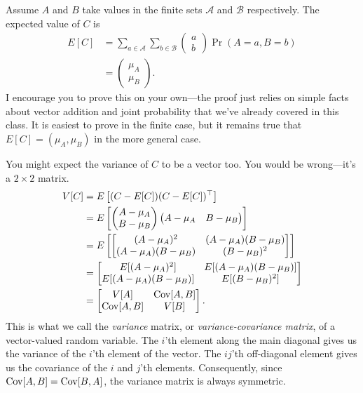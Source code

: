 \documentclass[
  12pt,
  oneside,openany]{book}
\begin{document}
Assume \(A\) and \(B\) take values in the finite sets \(\mathcal{A}\) and \(\mathcal{B}\) respectively. The expected value of \(C\) is
\[
\begin{aligned}
E[C]
&= \sum_{a \in \mathcal{A}} \sum_{b \in \mathcal{B}} \begin{pmatrix} a \\ b \end{pmatrix} \Pr(A = a, B = b) \\
&= \begin{pmatrix} \mu_A \\ \mu_B \end{pmatrix}.
\end{aligned}
\]
I encourage you to prove this on your own---the proof just relies on simple facts about vector addition and joint probability that we've already covered in this class. It is easiest to prove in the finite case, but it remains true that \(E[C] = (\mu_A, \mu_B)\) in the more general case.

You might expect the variance of \(C\) to be a vector too. You would be wrong---it's a \(2 \times 2\) matrix.
\[
\begin{aligned}
V[C]
&= E\left[(C - E[C]) (C - E[C])^\top \right] \\
&= E \left[
  \begin{pmatrix} A - \mu_A \\ B - \mu_B \end{pmatrix}
  \begin{pmatrix} A - \mu_A & B - \mu_B \end{pmatrix}
\right] \\
&= E \left[
  \begin{bmatrix}
  (A - \mu_A)^2 & (A - \mu_A) (B - \mu_B) \\
  (A - \mu_A) (B - \mu_B) & (B - \mu_B)^2
  \end{bmatrix}
\right] \\
&= \begin{bmatrix}
  E[(A - \mu_A)^2] & E[(A - \mu_A) (B - \mu_B)] \\
  E[(A - \mu_A) (B - \mu_B)] & E[(B - \mu_B)^2]
\end{bmatrix} \\
&= \begin{bmatrix}
  V[A] & \mathop{\rm Cov}\nolimits[A, B] \\
  \mathop{\rm Cov}\nolimits[A, B] & V[B]
\end{bmatrix}.
\end{aligned}
\]
This is what we call the \emph{variance} matrix, or \emph{variance-covariance matrix}, of a vector-valued random variable. The \(i\)'th element along the main diagonal gives us the variance of the \(i\)'th element of the vector. The \(ij\)'th off-diagonal element gives us the covariance of the \(i\) and \(j\)'th elements. Consequently, since \(\mathop{\rm Cov}\nolimits[A, B] = \mathop{\rm Cov}\nolimits[B, A]\), the variance matrix is always symmetric.
\end{document}
